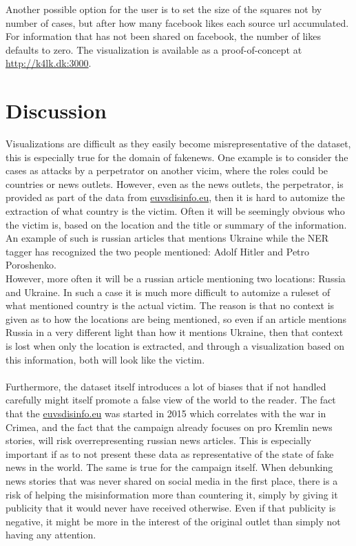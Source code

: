 \documentclass{article}
\begin{document}
Another possible option for the user is to set the size of the squares not by number of cases, but after how many facebook likes each source url accumulated. For information that has not been shared on facebook, the number of likes defaults to zero. The visualization is available as a proof-of-concept at \\\url{http://k4lk.dk:3000}.


\section{Discussion}
Visualizations are difficult as they easily become misrepresentative of the dataset, this is especially true for the domain of fakenews. One example is to consider the cases as attacks by a perpetrator on another vicim, where the roles could be countries or news outlets. However, even as the news outlets, the perpetrator, is provided as part of the data from \href{https://euvsdisinfo}{euvsdisinfo.eu}, then it is hard to automize the extraction of what country is the victim. Often it will be seemingly obvious who the victim is, based on the location and the title or summary of the information. An example of such is russian articles that mentions Ukraine while the NER tagger has recognized the two people mentioned: Adolf Hitler and Petro Poroshenko. \\
However, more often it will be a russian article mentioning two locations: Russia and Ukraine. In such a case it is much more difficult to automize a ruleset of what mentioned country is the actual victim. The reason is that no context is given as to how the locations are being mentioned, so even if an article mentions Russia in a very different light than how it mentions Ukraine, then that context is lost when only the location is extracted, and through a visualization based on this information, both will look like the victim.
\\\\
Furthermore, the dataset itself introduces a lot of biases that if not handled carefully might itself promote a false view of the world to the reader. The fact that the \href{https://euvsdisinfo.eu}{euvsdisinfo.eu} was started in 2015 which correlates with the war in Crimea, and the fact that the campaign already focuses on pro Kremlin news stories, will risk overrepresenting russian news articles. This is especially important if as to not present these data as representative of the state of fake news in the world. The same is true for the campaign itself. When debunking news stories that was never shared on social media in the first place, there is a risk of helping the misinformation more than countering it, simply by giving it publicity that it would never have received otherwise. Even if that publicity is negative, it might be more in the interest of the original outlet than simply not having any attention.
\end{document}
